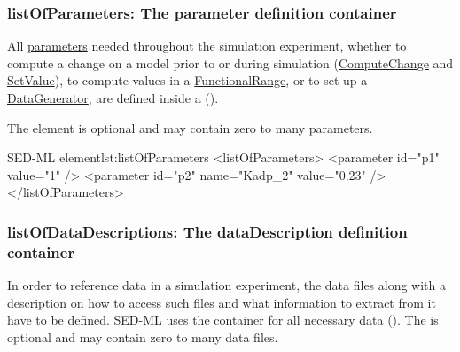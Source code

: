 \subsubsection{listOfParameters: The parameter definition container}
\label{sec:listOfParameters}
All \hyperref[class:parameter]{parameters} needed throughout the simulation experiment, whether to compute a change on a model prior to or during simulation (\hyperref[class:computeChange]{ComputeChange} and \hyperref[class:setValue]{SetValue}), to compute values in a \hyperref[class:functionalRange]{FunctionalRange}, or to set up a \hyperref[class:dataGenerator]{DataGenerator}, are defined inside a  ().


The element is optional and may contain zero to many parameters.

\begin{myXmlLst}{SED-ML  element}{lst:listOfParameters}
<listOfParameters>
	<parameter id="p1" value="1" />
	<parameter id="p2" name="Kadp_2" value="0.23" />
</listOfParameters>
\end{myXmlLst}


\subsubsection{listOfDataDescriptions: The dataDescription definition container}
\label{sec:listOfDataDescriptions}

In order to reference data in a simulation experiment, the data files along with a description on how to access such files and what information to extract from it have to be defined. SED-ML uses the  container for all necessary data (). The  is optional and may contain zero to many data files.



